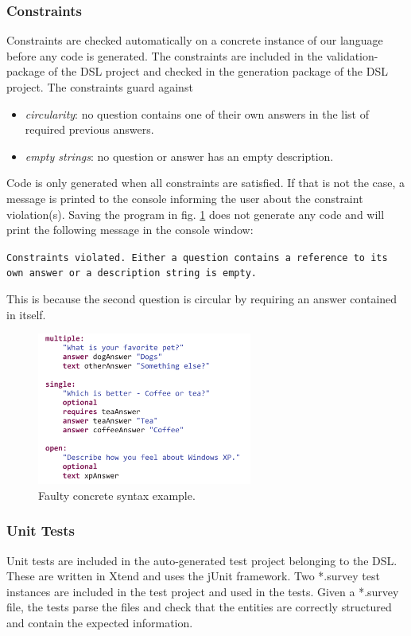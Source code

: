 \documentclass[runningheads]{llncs}
\begin{document}
\subsubsection{Constraints}
Constraints are checked automatically on a concrete instance of our language before any code is generated. The constraints are included in the validation-package of the DSL project and checked in the generation package of the DSL project. The constraints guard against
\begin{itemize}
\item \emph{circularity}: no question contains one of their own answers in the list of required previous answers.
\item \emph{empty strings}: no question or answer has an empty description.
\end{itemize}
Code is only generated when all constraints are satisfied. If that is not the case, a message is printed to the console informing the user about the constraint violation(s). Saving the program in fig. \ref{fig:concretefail} does not generate any code and will print the following message in the console window:

\noindent
\texttt{Constraints violated. Either a question contains a reference to its own answer or a description string is empty.}

This is because the second question is circular by requiring an answer contained in itself.
\begin{figure}
\centering
\includegraphics[height=5cm]{concretefail}
\caption{Faulty concrete syntax example.}
\label{fig:concretefail}
\end{figure}
\subsubsection{Unit Tests}
Unit tests are included in the auto-generated test project belonging to the DSL. These are written in Xtend and uses the jUnit framework. Two *.survey test instances are included in the test project and used in the tests. Given a *.survey file, the tests parse the files and check that the entities are correctly structured and contain the expected information. 
\end{document}
